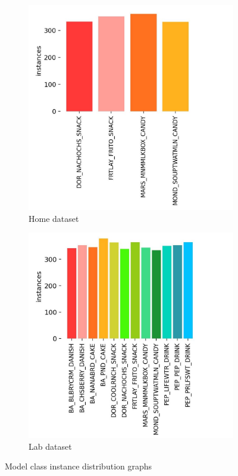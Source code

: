 \documentclass[thesis]{fputhesis}
\begin{document}
\begin{body}
\begin{figure}[h]
\begin{subfigure}[]{0.3\textwidth}
        \includegraphics[width=\textwidth]{Images/roomset-labels.jpg}
        \caption{Home dataset}
        \label{fig:room-dataset}
    \end{subfigure}
    \begin{subfigure}[]{0.3\textwidth}
        \includegraphics[width=\textwidth]{Images/labset-labels.jpg}
        \caption{Lab dataset}
        \label{fig:lab-dataset}
    \end{subfigure}
    \caption{Model class instance distribution graphs}
    \label{fig:dataset-labels}
\end{figure}



\end{body}
\end{document}
